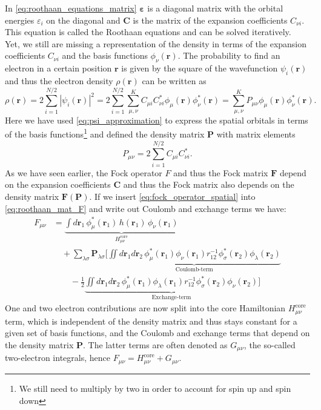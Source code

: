 In \autoref{eq:roothaan_equations_matrix} $\boldsymbol{\varepsilon}$ is a diagonal matrix with the orbital energies $\varepsilon_i$ on the diagonal and $\mathbf{C}$ is the matrix of the expansion coefficients $C_{\nu i}$. This equation is called the Roothaan equations and can be solved iteratively. \\
Yet, we still are missing a representation of the density in terms of the expansion coefficients $C_{\nu i}$ and the basis functions $\phi_\nu(\mathbf{r})$. The probability to find an electron in a certain position $\mathbf{r}$ is given by the square of the wavefunction $\psi_i(\mathbf{r})$ and thus the electron density $\rho(\mathbf{r})$ can be written as
\begin{equation}
    \rho(\mathbf{r}) = 2 \sum_{i=1}^{N/2} |\psi_i(\mathbf{r})|^2 = 2 \sum_{i=1}^{N/2} \sum_{\mu,\nu}^{K} C_{\mu i} C_{\nu i}^* \phi_\mu(\mathbf{r}) \phi_\nu^*(\mathbf{r}) = \sum_{\mu,\nu}^{K} P_{\mu \nu} \phi_\mu(\mathbf{r}) \phi_\nu^*(\mathbf{r}).
\end{equation}
Here we have used \autoref{eq:psi_approximation} to express the spatial orbitals in terms of the basis functions\footnote{We still need to multiply by two in order to account for spin up and spin down} and defined the density matrix $\mathbf{P}$ with matrix elements
\begin{equation}
    \label{eq:density_matrix}
    P_{\mu \nu} = 2 \sum_{i=1}^{N/2} C_{\mu i} C_{\nu i}^*.
\end{equation}
As we have seen earlier, the Fock operator $F$ and thus the Fock matrix $\mathbf{F}$ depend on the expansion coefficients $\mathbf{C}$ and thus the Fock matrix also depends on the density matrix $\mathbf{F(P)}$. If we insert \autoref{eq:fock_operator_spatial} into \autoref{eq:roothaan_mat_F} and write out Coulomb and exchange terms we have: 
\begin{align}
    \label{eq:fock_full_eq_coul_ex}
        F_{\mu \nu} &= \underbrace{\int d\mathbf{r}_1\, \phi_\mu^*(\mathbf{r}_1)\, h(\mathbf{r}_1)\, \phi_\nu(\mathbf{r}_1) \nonumber}_{H_{\mu\nu}^\text{core}} \\
        &\quad + \sum_{\lambda \sigma} \mathbf{P}_{\lambda \sigma} \Bigg[
            \underbrace{\iint  d\mathbf{r}_1 d\mathbf{r}_2\, \phi_\mu^*(\mathbf{r}_1) \phi_\nu(\mathbf{r}_1) r_{12}^{-1} \phi_\sigma^*(\mathbf{r}_2) \phi_\lambda(\mathbf{r}_2) \nonumber}_{\text{Coulomb-term}} \\
            &\qquad - \frac{1}{2} \underbrace{\iint d\mathbf{r}_1 d\mathbf{r}_2\, \phi_\mu^*(\mathbf{r}_1) \phi_\lambda(\mathbf{r}_1) r_{12}^{-1} \phi_\sigma^*(\mathbf{r}_2) \phi_\nu(\mathbf{r}_2)}_{\text{Exchange-term}}
            \Bigg]
\end{align}
One and two electron contributions are now split into the core Hamiltonian $H_{\mu\nu}^\text{core}$ term, which is independent of the density matrix and thus stays constant for a given set of basis functions, and the Coulomb and exchange terms that depend on the density matrix $\mathbf{P}$. The latter terms are often denoted as $G_{\mu\nu}$, the so-called two-electron integrals, hence $F_{\mu \nu} = H_{\mu\nu}^\text{core} + G_{\mu\nu}$.

